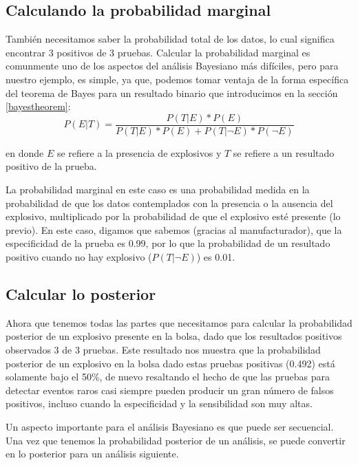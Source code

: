 \documentclass[
  12pt,
]{book}
\theoremstyle{definition}
\theoremstyle{definition}
\theoremstyle{definition}
\theoremstyle{remark}
\begin{document}
\hypertarget{calculando-la-probabilidad-marginal}{%
\subsection{Calculando la probabilidad marginal}\label{calculando-la-probabilidad-marginal}}

También necesitamos saber la probabilidad total de los datos, lo cual significa encontrar 3 positivos de 3 pruebas. Calcular la probabilidad marginal es comunmente uno de los aspectos del análisis Bayesiano más difíciles, pero para nuestro ejemplo, es simple, ya que, podemos tomar ventaja de la forma específica del teorema de Bayes para un resultado binario que introducimos en la sección \ref{bayestheorem}:
\[
P(E|T) = \frac{P(T|E)*P(E)}{P(T|E)*P(E) + P(T|\neg E)*P(\neg E)}
\]

en donde \(E\) se refiere a la presencia de explosivos y \(T\) se refiere a un resultado positivo de la prueba.

La probabilidad marginal en este caso es una probabilidad medida en la probabilidad de que los datos contemplados con la presencia o la ausencia del explosivo, multiplicado por la probabilidad de que el explosivo esté presente (lo previo). En este caso, digamos que sabemos (gracias al manufacturador), que la especificidad de la prueba es 0.99, por lo que la probabilidad de un resultado positivo cuando no hay explosivo (\(P(T|\neg E)\)) es 0.01.

\hypertarget{calcular-lo-posterior}{%
\subsection{Calcular lo posterior}\label{calcular-lo-posterior}}

Ahora que tenemos todas las partes que necesitamos para calcular la probabilidad posterior de un explosivo presente en la bolsa, dado que los resultados positivos observados 3 de 3 pruebas.
Este resultado nos muestra que la probabilidad posterior de un explosivo en la bolsa dado estas pruebas positivas (0.492) está solamente bajo el 50\%, de nuevo resaltando el hecho de que las pruebas para detectar eventos raros casi siempre pueden producir un gran número de falsos positivos, incluso cuando la especificidad y la sensibilidad son muy altas.

Un aspecto importante para el análisis Bayesiano es que puede ser secuencial. Una vez que tenemos la probabilidad posterior de un análisis, se puede convertir en lo posterior para un análisis siguiente.
\end{document}

